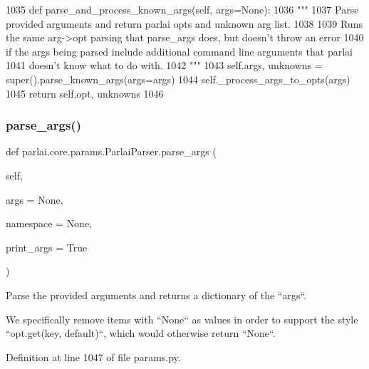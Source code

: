 \begin{DoxyCode}
1035     \textcolor{keyword}{def }parse\_and\_process\_known\_args(self, args=None):
1036         \textcolor{stringliteral}{"""}
1037 \textcolor{stringliteral}{        Parse provided arguments and return parlai opts and unknown arg list.}
1038 \textcolor{stringliteral}{}
1039 \textcolor{stringliteral}{        Runs the same arg->opt parsing that parse\_args does, but doesn't throw an error}
1040 \textcolor{stringliteral}{        if the args being parsed include additional command line arguments that parlai}
1041 \textcolor{stringliteral}{        doesn't know what to do with.}
1042 \textcolor{stringliteral}{        """}
1043         self.args, unknowns = super().parse\_known\_args(args=args)
1044         self.\_process\_args\_to\_opts(args)
1045         \textcolor{keywordflow}{return} self.opt, unknowns
1046 
\end{DoxyCode}
\mbox{\label{classparlai_1_1core_1_1params_1_1ParlaiParser_ad549d75e2808d63fbc5c5d0e30682f18}} 
\subsubsection{\texorpdfstring{parse\+\_\+args()}{parse\_args()}}
{\footnotesize\ttfamily def parlai.\+core.\+params.\+Parlai\+Parser.\+parse\+\_\+args (\begin{DoxyParamCaption}\item[{}]{self,  }\item[{}]{args = {\ttfamily None},  }\item[{}]{namespace = {\ttfamily None},  }\item[{}]{print\+\_\+args = {\ttfamily True} }\end{DoxyParamCaption})}

\begin{DoxyVerb}Parse the provided arguments and returns a dictionary of the ``args``.

We specifically remove items with ``None`` as values in order to support the
style ``opt.get(key, default)``, which would otherwise return ``None``.
\end{DoxyVerb}
 

Definition at line 1047 of file params.\+py.


